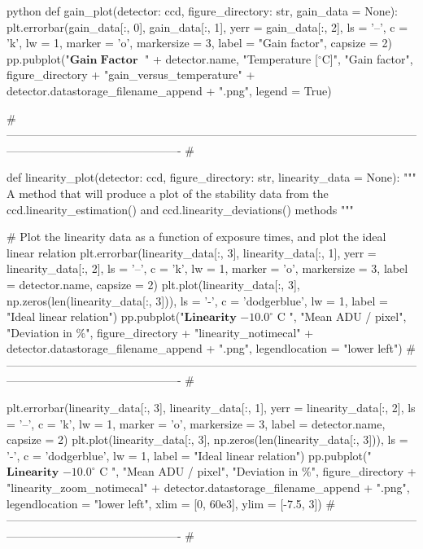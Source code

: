 \documentclass[../main.tex]{subfiles}
\begin{document}
\begin{mintedbox}{python}
def gain_plot(detector: ccd, figure_directory: str, gain_data  =  None):
plt.errorbar(gain_data[:, 0], gain_data[:, 1], yerr  =  gain_data[:, 2], ls  =  '--', c  =  'k', lw  =  1, marker  =  'o',
markersize  =  3, label  =  "Gain factor", capsize  =  2)
pp.pubplot("$\mathbf{Gain\;Factor\;}$ " + detector.name, "Temperature [$^\circ$C]", "Gain factor",
figure_directory + "gain_versus_temperature" + detector.datastorage_filename_append + ".png",
legend  =  True)

# ---------------------------------------------------------------------------------------------------------------------------------------------------------- #


def linearity_plot(detector: ccd, figure_directory: str, linearity_data  =  None):
"""
A method that will produce a plot of the stability data
from the ccd.linearity_estimation() and ccd.linearity_deviations() methods
"""

# Plot the linearity data as a function of exposure times, and plot the ideal linear relation
plt.errorbar(linearity_data[:, 3], linearity_data[:, 1], yerr  =  linearity_data[:, 2], ls  =  '--', c  =  'k', lw  =  1,
marker  =  'o', markersize  =  3, label  =  detector.name, capsize  =  2)
plt.plot(linearity_data[:, 3], np.zeros(len(linearity_data[:, 3])), ls  =  '-', c  =  'dodgerblue', lw  =  1,
label  =  "Ideal linear relation")
pp.pubplot("$\mathbf{Linearity}$ $-10.0^\circ $ C ", "Mean ADU / pixel", "Deviation in \%",
figure_directory + "linearity_notimecal" + detector.datastorage_filename_append + ".png",
legendlocation  =  "lower left")
# ---------------------------------------------------------------------------------------------------------------------------------------------------------- #

plt.errorbar(linearity_data[:, 3], linearity_data[:, 1], yerr  =  linearity_data[:, 2], ls  =  '--', c  =  'k', lw  =  1,
marker  =  'o', markersize  =  3, label  =  detector.name, capsize  =  2)
plt.plot(linearity_data[:, 3], np.zeros(len(linearity_data[:, 3])), ls  =  '-', c  =  'dodgerblue', lw  =  1,
label  =  "Ideal linear relation")
pp.pubplot("$\mathbf{Linearity}$ $-10.0^\circ $ C ", "Mean ADU / pixel", "Deviation in \%",
figure_directory + "linearity_zoom_notimecal" + detector.datastorage_filename_append + ".png",
legendlocation  =  "lower left", xlim  =  [0, 60e3], ylim  =  [-7.5, 3])
# ---------------------------------------------------------------------------------------------------------------------------------------------------------- #



\end{mintedbox}
\end{document}
